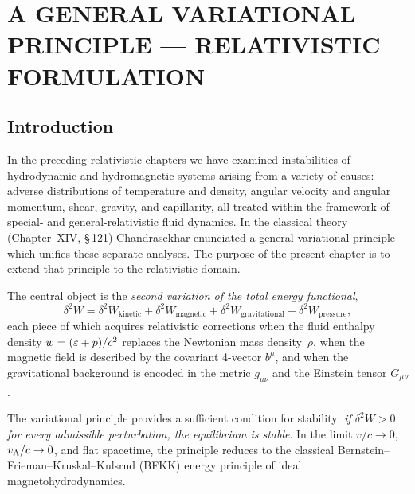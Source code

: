 
\chapter{A GENERAL VARIATIONAL PRINCIPLE --- RELATIVISTIC FORMULATION}
\label{ch:rel-14}

\section{Introduction}\label{sec:rel-121}

In the preceding relativistic chapters we have examined instabilities
of hydrodynamic and hydromagnetic systems arising from a variety of
causes: adverse distributions of temperature and density, angular
velocity and angular momentum, shear, gravity, and capillarity, all
treated within the framework of special- and general-relativistic
fluid dynamics.  In the classical theory (Chapter~XIV, \S\,121)
Chandrasekhar enunciated a general variational principle which
unifies these separate analyses.  The purpose of the present chapter
is to extend that principle to the relativistic domain.

The central object is the \emph{second variation of the total energy
functional},
\begin{equation}
  \delta^{2}W
  = \delta^{2}W_{\mathrm{kinetic}}
  + \delta^{2}W_{\mathrm{magnetic}}
  + \delta^{2}W_{\mathrm{gravitational}}
  + \delta^{2}W_{\mathrm{pressure}},
  \label{eq:rel14-deltaW-decomposition}
\end{equation}
each piece of which acquires relativistic corrections when the fluid
enthalpy density $w = (\varepsilon+p)/c^{2}$ replaces the
Newtonian mass density~$\rho$, when the magnetic field is described
by the covariant 4-vector $b^{\mu}$, and when the gravitational
background is encoded in the metric $g_{\mu\nu}$ and the Einstein
tensor $G_{\mu\nu}$.

The variational principle provides a sufficient condition for
stability: \emph{if $\delta^{2}W > 0$ for every admissible
perturbation, the equilibrium is stable}.  In the limit
$v/c\to 0$, $v_{\mathrm{A}}/c\to 0$, and flat spacetime, the principle reduces
to the classical Bernstein--Frieman--Kruskal--Kulsrud (BFKK) energy
principle of ideal magnetohydrodynamics.

